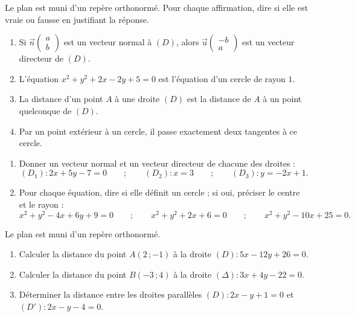 \documentclass[11pt]{article}
\begin{document}
\begin{exercice}
Le plan est muni d'un repère orthonormé. Pour chaque affirmation, dire si elle est vraie ou fausse en justifiant la réponse.
\begin{enumerate}
\item Si $\vec{n}\begin{pmatrix} a \\ b \end{pmatrix}$ est un vecteur normal à $(D)$, alors $\vec{u}\begin{pmatrix} -b \\ a \end{pmatrix}$ est un vecteur directeur de $(D)$.
\item L'équation $x^2 + y^2 + 2x - 2y + 5 = 0$ est l'équation d'un cercle de rayon $1$.
\item La distance d'un point $A$ à une droite $(D)$ est la distance de $A$ à un point quelconque de $(D)$.
\item Par un point extérieur à un cercle, il passe exactement deux tangentes à ce cercle.
\end{enumerate}
\end{exercice}

\begin{exercice}
\begin{enumerate}
\item Donner un vecteur normal et un vecteur directeur de chacune des droites :
\[ (D_1) : 2x + 5y - 7 = 0 \qquad ; \qquad (D_2) : x = 3 \qquad ; \qquad (D_3) : y = -2x + 1. \]
\item Pour chaque équation, dire si elle définit un cercle ; si oui, préciser le centre et le rayon :
\[ x^2 + y^2 - 4x + 6y + 9 = 0 \qquad ; \qquad x^2 + y^2 + 2x + 6 = 0 \qquad ; \qquad x^2 + y^2 - 10x + 25 = 0. \]
\end{enumerate}
\end{exercice}

\begin{exercice}
Le plan est muni d'un repère orthonormé.
\begin{enumerate}
\item Calculer la distance du point $A(2\,;-1)$ à la droite $(D) : 5x - 12y + 26 = 0$.
\item Calculer la distance du point $B(-3\,;4)$ à la droite $(\Delta) : 3x + 4y - 22 = 0$.
\item Déterminer la distance entre les droites parallèles $(D) : 2x - y + 1 = 0$ et $(D') : 2x - y - 4 = 0$.
\end{enumerate}
\end{exercice}
\end{document}
